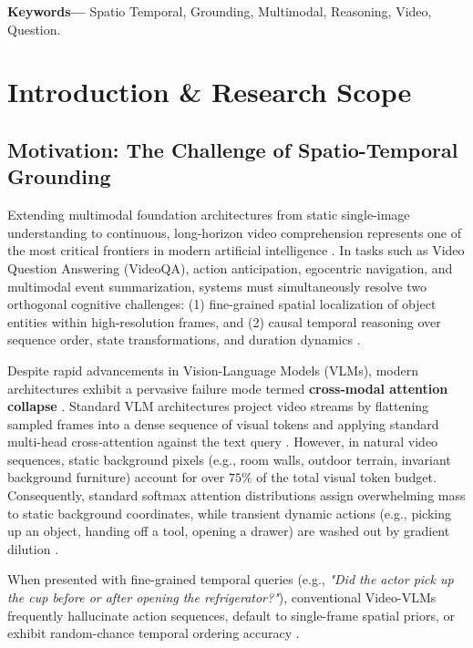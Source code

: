 \documentclass[10pt,twocolumn,letterpaper]{article}
\begin{document}
\noindent\textbf{Keywords---} Spatio Temporal, Grounding, Multimodal, Reasoning, Video, Question.







\section{Introduction \& Research Scope}



\subsection{Motivation: The Challenge of Spatio-Temporal Grounding}


Extending multimodal foundation architectures from static single-image understanding to continuous, long-horizon video comprehension represents one of the most critical frontiers in modern artificial intelligence \cite{arxiv_2010_11146,arxiv_2005_14165}. In tasks such as Video Question Answering (VideoQA), action anticipation, egocentric navigation, and multimodal event summarization, systems must simultaneously resolve two orthogonal cognitive challenges: (1) fine-grained spatial localization of object entities within high-resolution frames, and (2) causal temporal reasoning over sequence order, state transformations, and duration dynamics \cite{arxiv_2203_02155,arxiv_2312_03893}.

Despite rapid advancements in Vision-Language Models (VLMs), modern architectures exhibit a pervasive failure mode termed \textbf{cross-modal attention collapse} \cite{arxiv_2406_00584}. Standard VLM architectures project video streams by flattening sampled frames into a dense sequence of visual tokens and applying standard multi-head cross-attention against the text query \cite{arxiv_2305_18290}. However, in natural video sequences, static background pixels (e.g., room walls, outdoor terrain, invariant background furniture) account for over $75\%$ of the total visual token budget. Consequently, standard softmax attention distributions assign overwhelming mass to static background coordinates, while transient dynamic actions (e.g., picking up an object, handing off a tool, opening a drawer) are washed out by gradient dilution \cite{arxiv_2501_02497}.

When presented with fine-grained temporal queries (e.g., \textit{"Did the actor pick up the cup before or after opening the refrigerator?"}), conventional Video-VLMs frequently hallucinate action sequences, default to single-frame spatial priors, or exhibit random-chance temporal ordering accuracy \cite{arxiv_2405_01543,crossref_10_1016_j_aei_2026_104392}.
\end{document}
